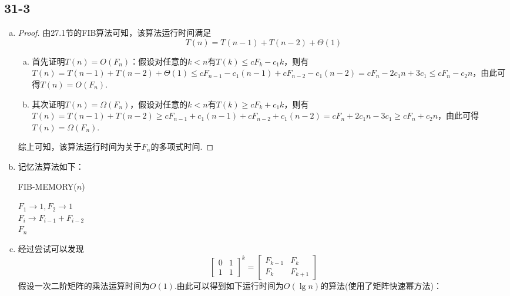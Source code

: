 \documentclass[twocolumn]{article}
\newenvironment{SChinese}{
	\CJKfamily{gbsn}
	\CJKtilde
	\CJKnospace}{}
\begin{document}
\begin{CJK}{UTF8}{}
\begin{SChinese}
			\subsection*{31-3}
				\begin{enumerate}[a.]
					\item \begin{proof}
						由27.1节的FIB算法可知，该算法运行时间满足\begin{displaymath}
							T(n)=T(n-1)+T(n-2)+\Theta(1)
						\end{displaymath}
						\begin{enumerate}[(a)]
							\item 首先证明$T(n)=O(F_n)$：假设对任意的$k<n$有$T(k)\le cF_k-c_1k$，则有$T(n)=T(n-1)+T(n-2)+\Theta(1)\le cF_{n-1}-c_1(n-1)+cF_{n-2}-c_1(n-2)=cF_n-2c_1n+3c_1\le cF_n-c_2n$，由此可得$T(n)=O(F_n)$.\\
							\item 其次证明$T(n)=\Omega(F_n)$，假设对任意的$k<n$有$T(k)\ge cF_k+c_1k$，则有$T(n)=T(n-1)+T(n-2)\ge cF_{n-1}+c_1(n-1)+cF_{n-2}+c_1(n-2)=cF_n+2c_1n-3c_1\ge cF_n+c_2n$，由此可得$T(n)=\Omega(F_n)$.\\
						\end{enumerate}
						综上可知，该算法运行时间为关于$F_n$的多项式时间.
					\end{proof}
				\item 记忆法算法如下：
				\begin{algorithm}
					\caption{FIB-MEMORY($n$)}
					\begin{algorithmic}[1]
						\STATE $F_1\rightarrow1,F_2\rightarrow1$ \\
						\STATE $F_i\rightarrow F_{i-1}+F_{i-2}$ \\
						\ENDFOR
						\RETURN $F_n$
					\end{algorithmic}
				\end{algorithm}
				\item 经过尝试可以发现\begin{displaymath}
					\left[\begin{matrix}
					0 & 1\\
					1 & 1
					\end{matrix}
					\right]^k=\left[\begin{matrix}
					F_{k-1} & F_k\\
					F_k & F_{k+1}
					\end{matrix}
					\right]
				\end{displaymath}
				假设一次二阶矩阵的乘法运算时间为$O(1)$.由此可以得到如下运行时间为$O(\lg n)$的算法(使用了矩阵快速幂方法)：

\end{enumerate}
\end{SChinese}
\end{CJK}
\end{document}
